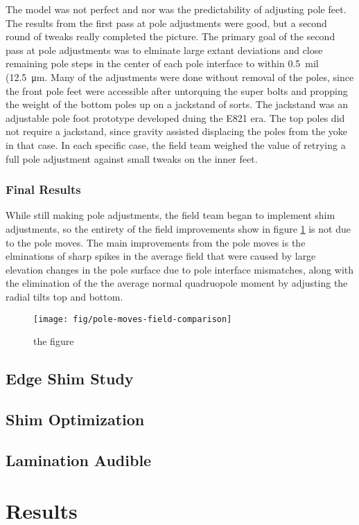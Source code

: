 The model was not perfect and nor was the predictability of adjusting pole feet.  The results from the first pass at pole adjustments were good, but a second round of tweaks really completed the picture.  The primary goal of the second pass at pole adjustments was to elminate large extant deviations and close remaining pole steps in the center of each pole interface to within \SI{0.5}{mil} (\SI{12.5}{\micro\meter}.  Many of the adjustments were done without removal of the poles, since the front pole feet were accessible after untorquing the super bolts and propping the weight of the bottom poles up on a jackstand of sorts.  The jackstand was an adjustable pole foot prototype developed duing the E821 era.  The top poles did not require a jackstand, since gravity assisted displacing the poles from the yoke in that case.  In each specific case, the field team weighed the value of retrying a full pole adjustment against small tweaks on the inner feet.  

\subsubsection{Final Results}

While still making pole adjustments, the field team began to implement shim adjustments, so the entirety of the field improvements show in figure \ref{fig:pole-moves-field-comparison} is not due to the pole moves.  The main improvements from the pole moves is the elminations of sharp spikes in the average field that were caused by large elevation changes in the pole surface due to pole interface mismatches, along with the elimination of the the average normal quadruopole moment by adjusting the radial tilts top and bottom.

\begin{figure}
\texttt{[image: fig/pole-moves-field-comparison]}
\caption{the figure}
\label{fig:pole-moves-field-comparison}
\end{figure}


\subsection{Edge Shim Study}


\subsection{Shim Optimization}


\subsection{Lamination Audible}


\section{Results}